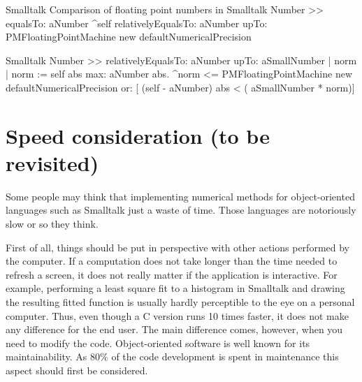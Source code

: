 \begin{listing}[label=lst:fltcompare]{Smalltalk}
{Comparison of floating point numbers in Smalltalk}
Number >> equalsTo: aNumber
   ^self relativelyEqualsTo: aNumber upTo:
         PMFloatingPointMachine new defaultNumericalPrecision
\end{listing}

\begin{displaycode}{Smalltalk}
Number >> relativelyEqualsTo: aNumber upTo: aSmallNumber
   | norm |
   norm := self abs max: aNumber abs.
   ^norm <= PMFloatingPointMachine new defaultNumericalPrecision
    or: [ (self - aNumber) abs < ( aSmallNumber * norm)]
\end{displaycode}

\section{Speed consideration (to be revisited)}
\label{sec:speed} Some people may think that implementing
numerical methods for object-oriented languages such as Smalltalk just a waste
of time. Those languages are notoriously slow or so they think.

First of all, things should be put in perspective with other
actions performed by the computer. If a computation does not take
longer than the time needed to refresh a screen, it does not
really matter if the application is interactive. For example,
performing a least square fit to a histogram in Smalltalk and drawing the
resulting fitted function is usually hardly perceptible to the eye on a personal
computer. Thus, even though a C version runs 10 times faster, it
does not make any difference for the end user. The main difference
comes, however, when you need to modify the code. Object-oriented
software is well known for its maintainability. As $80\%$ of the
code development is spent in maintenance this aspect should first
be considered.


